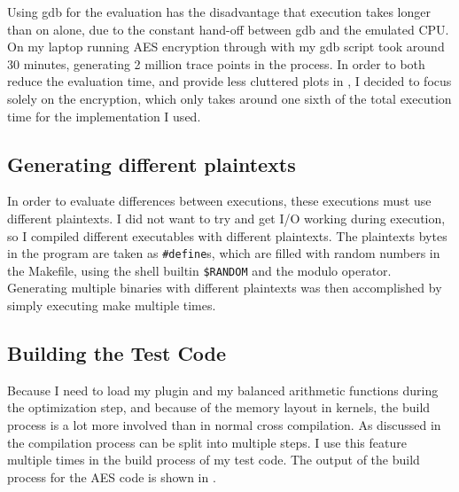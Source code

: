 Using gdb for the evaluation has the disadvantage that execution takes longer than on \qemu{} alone, due to the constant hand-off between gdb and the emulated CPU.
On my laptop running AES encryption through \qemu{} with my gdb script took around 30 minutes, generating 2 million trace points in the process.
In order to both reduce the evaluation time, and provide less cluttered plots in , I decided to focus solely on the encryption, which only takes around one sixth of the total execution time for the implementation I used.

\subsection{Generating different plaintexts}
In order to evaluate \hammingw{} differences between executions, these executions must use different plaintexts.
I did not want to try and get I/O working during execution, so I compiled different executables with different plaintexts.
The plaintexts bytes in the program are taken as \texttt{\#define}s, which are filled with random numbers in the Makefile, using the shell builtin \texttt{\$RANDOM} and the modulo operator.
Generating multiple binaries with different plaintexts was then accomplished by simply executing make multiple times.

\subsection{Building the Test Code}
\label{buildtest}
Because I need to load my plugin and my balanced arithmetic functions during the optimization step, and because of the memory layout in \qemu{} kernels, the build process is a lot more involved than in normal cross compilation.
As discussed in  the \llvm{} compilation process can be split into multiple steps.
I use this feature multiple times in the build process of my test code.
The output of the build process for the AES code is shown in .


